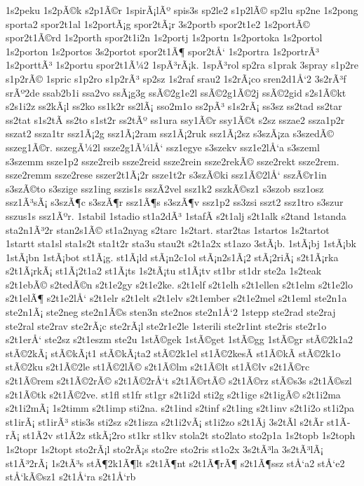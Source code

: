 {1s2peku
1s2pÃ©k
s2p1Ã©r
1spirÃ¡lÃº
spis3s
sp2le2
s1p2lÃ©
sp2lu
sp2ne
1s2pong
sporta2
spor2t1al
1s2portÃ¡g
spor2tÃ¡r
3s2portb
spor2t1e2
1s2portÃ©
spor2t1Ã©rd
1s2porth
spor2t1i2n
1s2portj
1s2portn
1s2portoka
1s2portol
1s2porton
1s2portos
3s2portot
spor2t1Ã¶
spor2tÅ‘
1s2portra
1s2portrÃ³
1s2porttÃ³
1s2portu
spor2t1Ã¼2
1spÃ³rÃ¡k.
1spÃ³rol
sp2ra
s1prak
3spray
s1p2re
s1p2rÃ©
1spric
s1p2ro
s1p2rÃ³
sp2sz
1s2raf
srau2
1s2rÃ¡co
sren2d1Å‘2
3s2rÃ³f
srÃº2de
ssab2b1i
ssa2vo
ssÃ¡g3g
ssÃ©2g1e2l
ssÃ©2g1Ã©2j
ssÃ©2gid
s2s1Ã©kt
s2s1i2z
ss2kÃ¡l
ss2ko
ss1k2r
ss2lÃ¡
sso2m1o
ss2pÃ³
s1s2rÃ¡
ss3sz
ss2tad
ss2tar
ss2tat
s1s2tÃ­
ss2to
s1st2r
ss2tÃº
ss1ura
ssy1Ã©r
ssy1Ã©t
s2sz
sszae2
ssza1p2r
sszat2
ssza1tr
ssz1Ã¡2g
ssz1Ã¡2ram
ssz1Ã¡2ruk
ssz1Ã¡2sz
s3szÃ¡za
s3szedÃ©
sszeg1Ã©r.
sszegÃ¼2l
ssze2g1Ã¼lÅ‘
ssz1egye
s3szekv
ssz1e2lÅ‘a
s3szeml
s3szemm
ssze1p2
ssze2reib
ssze2reid
ssze2rein
ssze2rekÃ©
ssze2rekt
ssze2rem.
ssze2remm
ssze2rese
sszer2t1Ã¡2r
ssze1t2r
s3szÃ©ki
ssz1Ã©2lÅ‘
sszÃ©r1in
s3szÃ©to
s3szige
ssz1ing
sszis1s
sszÃ­2vel
ssz1k2
sszkÃ©sz1
s3szob
ssz1osz
ssz1Ã³sÃ¡
s3szÃ¶c
s3szÃ¶r
ssz1Ã¶s
s3szÃ¶v
ssz1p2
ss3zsi
sszt2
ssz1tro
s3szur
sszus1s
ssz1Ãºr.
1stabil
1stadio
st1a2dÃ³
1stafÃ­
s2t1alj
s2t1alk
s2tand
1standa
sta2n1Ã³2r
stan2s1Ã©
st1a2nyag
s2tarc
1s2tart.
star2tas
1startos
1s2tartot
1startt
sta1sl
sta1s2t
sta1t2r
sta3u
stau2t
s2t1a2x
st1azo
3stÃ¡b.
1stÃ¡bj
1stÃ¡bk
1stÃ¡bn
1stÃ¡bot
st1Ã¡g.
st1Ã¡ld
stÃ¡n2c1ol
stÃ¡n2s1Ã¡2
stÃ¡2riÃ¡
s2t1Ã¡rka
s2t1Ã¡rkÃ¡
st1Ã¡2t1a2
st1Ã¡ts
1s2tÃ¡tu
st1Ã¡tv
st1br
st1dr
ste2a
1s2teak
s2t1ebÃ©
s2tedÃ©n
s2t1e2gy
s2t1e2ke.
s2t1elf
s2t1elh
s2t1ellen
s2t1elm
s2t1e2lo
s2t1elÃ¶
s2t1e2lÅ‘
s2t1elr
s2t1elt
s2t1elv
s2t1ember
s2t1e2mel
s2t1eml
ste2n1a
ste2n1Ã¡
ste2neg
ste2n1Ã©s
sten3n
ste2nos
ste2n1Å‘2
1stepp
ste2rad
ste2raj
ste2ral
ste2rav
ste2rÃ¡c
ste2rÃ¡l
ste2r1e2le
1sterili
ste2r1int
ste2ris
ste2r1o
s2t1erÅ‘
ste2sz
s2t1eszm
ste2u
1stÃ©gek
1stÃ©get
1stÃ©gg
1stÃ©gr
stÃ©2k1a2
stÃ©2kÃ¡
stÃ©kÃ¡t1
stÃ©kÃ¡ta2
stÃ©2k1el
st1Ã©2kesÃ­
st1Ã©kÃ­
stÃ©2k1o
stÃ©2ku
s2t1Ã©2le
st1Ã©2lÃ©
s2t1Ã©lm
s2t1Ã©lt
st1Ã©lv
s2t1Ã©rc
s2t1Ã©rem
s2t1Ã©2rÃ©
s2t1Ã©2rÅ‘t
s2t1Ã©rtÃ©
s2t1Ã©rz
stÃ©s3s
s2t1Ã©szl
s2t1Ã©tk
s2t1Ã©2ve.
st1fl
st1fr
st1gr
s2t1i2d
sti2g
s2t1ige
s2t1igÃ©
s2t1i2ma
s2t1i2mÃ¡
1s2timm
s2t1imp
sti2na.
s2t1ind
s2tinf
s2t1ing
s2t1inv
s2t1i2o
st1i2pa
st1irÃ¡
st1irÃ³
stis3s
sti2sz
s2t1isza
s2t1i2vÃ¡
st1i2zo
s2t1Ã­j
3s2tÃ­l
s2tÃ­r
st1Ã­rÃ¡
st1Ã­2v
st1Ã­2z
stkÃ¡2ro
st1kr
st1kv
stola2t
sto2lato
sto2p1a
1s2topb
1s2toph
1s2topr
1s2topt
sto2rÃ¡l
sto2rÃ¡s
sto2re
sto2ris
st1o2x
3s2tÃ³la
3s2tÃ³lÃ¡
st1Ã³2rÃ¡
1s2tÃ³s
stÃ¶2k1Ã¶lt
s2t1Ã¶nt
s2t1Ã¶rÃ¶
s2t1Ã¶ssz
stÅ‘a2
stÅ‘e2
stÅ‘kÃ©sz1
s2t1Å‘ra
s2t1Å‘rb
}
